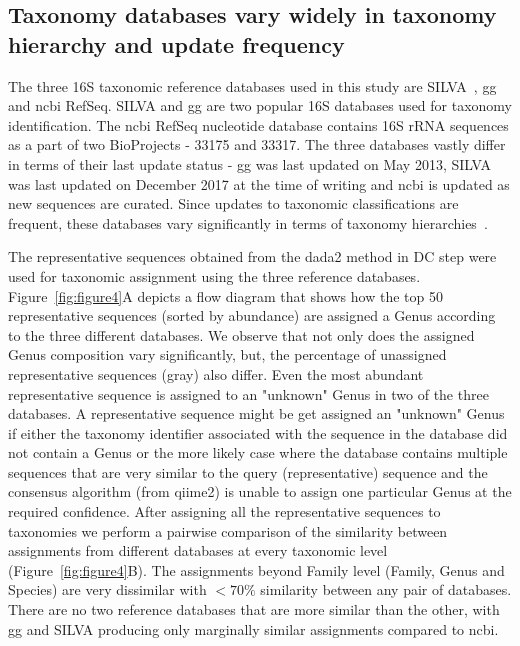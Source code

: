   \FloatBarrier

  \subsection*{Taxonomy databases vary widely in taxonomy hierarchy and update frequency}

  The three 16S taxonomic reference databases used in this study are SILVA~\cite{Quast2012}, \ac{gg}~\cite{DeSantis2006} and \ac{ncbi} RefSeq.
  SILVA and \ac{gg} are two popular 16S databases used for taxonomy identification.
  The \ac{ncbi} RefSeq nucleotide database contains 16S rRNA sequences as a part of two BioProjects - 33175 and 33317.
  The three databases vastly differ in terms of their last update status - \ac{gg} was last updated on May 2013, SILVA was last updated on December 2017 at the time of writing and \ac{ncbi} is updated as new sequences are curated.
  Since updates to taxonomic classifications are frequent, these databases vary significantly in terms of taxonomy hierarchies~\cite{Balvociute2017}.

  The representative sequences obtained from the \ac{dada2} method in DC step were used for taxonomic assignment using the three reference databases.
  Figure~\ref{fig:figure4}A depicts a flow diagram that shows how the top 50 representative sequences (sorted by abundance) are assigned a Genus according to the three different databases.
  We observe that not only does the assigned Genus composition vary significantly, but, the percentage of unassigned representative sequences (gray) also differ.
  Even the most abundant representative sequence is assigned to an "unknown" Genus in two of the three databases.
  A representative sequence might be get assigned an "unknown" Genus if either the taxonomy identifier associated with the sequence in the database did not contain a Genus or the more likely case where the database contains multiple sequences that are very similar to the query (representative) sequence and the consensus algorithm (from \ac{qiime2}) is unable to assign one particular Genus at the required confidence.
  After assigning all the representative sequences to taxonomies we perform a pairwise comparison of the similarity between assignments from different databases at every taxonomic level (Figure~\ref{fig:figure4}B).
  The assignments beyond Family level (Family, Genus and Species) are very dissimilar with $<70\%$ similarity between any pair of databases.
  There are no two reference databases that are more similar than the other, with \ac{gg} and SILVA producing only marginally similar assignments compared to \ac{ncbi}.

